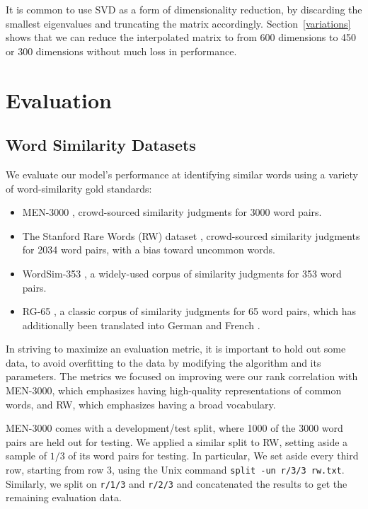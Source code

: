 \documentclass[11pt,letterpaper]{article}
\begin{document}
It is common to use SVD as a form of dimensionality reduction, by discarding
the smallest eigenvalues and truncating the matrix accordingly.
Section~\ref{variations} shows that we can reduce the interpolated matrix to
from 600 dimensions to 450 or 300 dimensions without much loss in performance.

\section{Evaluation}

\subsection{Word Similarity Datasets}

We evaluate our model's performance at identifying similar words using a
variety of word-similarity gold standards:

\begin{itemize}
\item MEN-3000 \cite{bruni2014men}, crowd-sourced similarity judgments for 3000
    word pairs.
\item The Stanford Rare Words (RW) dataset \cite{luong2013rw}, crowd-sourced
    similarity judgments for 2034 word pairs, with a bias toward uncommon words.
\item WordSim-353 \cite{finkelstein2001ws}, a widely-used corpus of similarity
    judgments for 353 word pairs.
\item RG-65 \cite{rubenstein1965rg}, a classic corpus of similarity judgments
    for 65 word pairs, which has additionally been translated into German
    \cite{gurevych2005german} and French \cite{joubarne2011french}.
\end{itemize}

In striving to maximize an evaluation metric, it is important to hold out some
data, to avoid overfitting to the data by modifying the algorithm and its
parameters. The metrics we focused on improving were our rank correlation with
MEN-3000, which emphasizes having high-quality representations of common words,
and RW, which emphasizes having a broad vocabulary.

MEN-3000 comes with a development/test split, where 1000 of the 3000 word pairs
are held out for testing. We applied a similar split to RW, setting aside a
sample of $1/3$ of its word pairs for testing. In particular, We set aside
every third row, starting from row 3, using the Unix command {\tt split -un
r/3/3 rw.txt}. Similarly, we split on {\tt r/1/3} and {\tt r/2/3} and
concatenated the results to get the remaining evaluation data.
\end{document}
